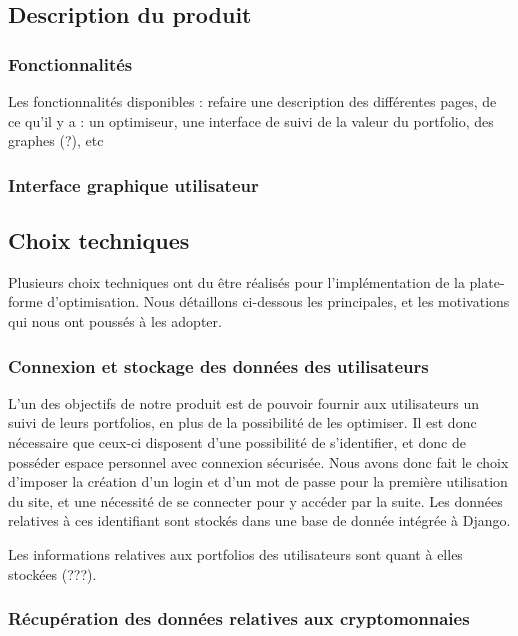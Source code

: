 \documentclass[a4paper, 10pt]{article}
\begin{document}
\subsection{Description du produit}

\subsubsection{Fonctionnalités}

Les fonctionnalités disponibles : refaire une description des différentes pages, de ce qu'il y a : un optimiseur, une interface de suivi de la valeur du portfolio, des graphes (?), etc

\subsubsection{Interface graphique utilisateur}


\subsection{Choix techniques}

Plusieurs choix techniques ont du être réalisés pour l'implémentation de la plate-forme d'optimisation. Nous détaillons ci-dessous les principales, et les motivations qui nous ont poussés à les adopter.

\subsubsection{Connexion et stockage des données des utilisateurs}

L'un des objectifs de notre produit est de pouvoir fournir aux utilisateurs un suivi de leurs portfolios, en plus de la possibilité de les optimiser. Il est donc nécessaire que ceux-ci disposent d'une possibilité de s'identifier, et donc de posséder espace personnel avec connexion sécurisée. Nous avons donc fait le choix d'imposer la création d'un login et d'un mot de passe pour la première utilisation du site, et une nécessité de se connecter pour y accéder par la suite. Les données relatives à ces identifiant sont stockés dans une base de donnée intégrée à Django.

Les informations relatives aux portfolios des utilisateurs sont quant à elles stockées (???).

\subsubsection{Récupération des données relatives aux cryptomonnaies}
\end{document}

